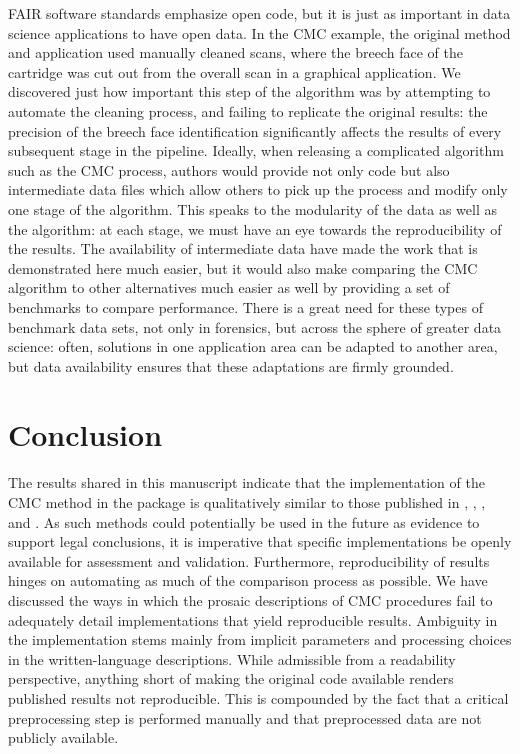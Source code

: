 FAIR software standards emphasize open code, but it is just as important
in data science applications to have open data. In the CMC example, the
original method and application used manually cleaned scans, where the
breech face of the cartridge was cut out from the overall scan in a
graphical application. We discovered just how important this step of the
algorithm was by attempting to automate the cleaning process, and
failing to replicate the original results: the precision of the breech
face identification significantly affects the results of every
subsequent stage in the pipeline. Ideally, when releasing a complicated
algorithm such as the CMC process, authors would provide not only code
but also intermediate data files which allow others to pick up the
process and modify only one stage of the algorithm. This speaks to the
modularity of the data as well as the algorithm: at each stage, we must
have an eye towards the reproducibility of the results. The availability
of intermediate data have made the work that is demonstrated here much
easier, but it would also make comparing the CMC algorithm to other
alternatives much easier as well by providing a set of benchmarks to
compare performance. There is a great need for these types of benchmark
data sets, not only in forensics, but across the sphere of greater data
science: often, solutions in one application area can be adapted to
another area, but data availability ensures that these adaptations are
firmly grounded.

\hypertarget{conclusion}{%
\section{Conclusion}\label{conclusion}}

The results shared in this manuscript indicate that the implementation
of the CMC method in the  package is qualitatively similar
to those published in \citet{song_3d_2014}, \citet{tong_improved_2015},
\citet{chen_convergence_2017}, and \citet{song_estimating_2018}. As such
methods could potentially be used in the future as evidence to support
legal conclusions, it is imperative that specific implementations be
openly available for assessment and validation. Furthermore,
reproducibility of results hinges on automating as much of the
comparison process as possible. We have discussed the ways in which the
prosaic descriptions of CMC procedures fail to adequately detail
implementations that yield reproducible results. Ambiguity in the
implementation stems mainly from implicit parameters and processing
choices in the written-language descriptions. While admissible from a
readability perspective, anything short of making the original code
available renders published results not reproducible. This is compounded
by the fact that a critical preprocessing step is performed manually and
that preprocessed data are not publicly available.

